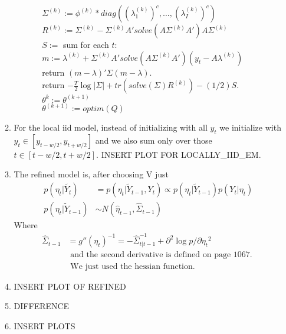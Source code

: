 \documentclass[paper=a4, fontsize=11pt]{scrartcl}
\begin{document}
\begin{enumerate}
\begin{enumerate}[1]
\begin{enumerate}[a.]
\begin{enumerate}[I.]
\begin{tabbing}
                  \hspace{2cm} $\Sigma^{(k)} := \phi^{(k)}*diag((\lambda_1^{(k)})^c, \ldots, (\lambda_I^{(k)})^c)$ \\
                  \hspace{2cm} $R^{(k)} := \Sigma^{(k)} - \Sigma^{(k)}A'solve(A\Sigma^{(k)}A')A\Sigma^{(k)}$ \\
                  \hspace{2cm} $S := $ sum for each $t$: \\
                  \hspace{3cm} $m := \lambda^{(k)} + \Sigma^{(k)}A'solve(A\Sigma^{(k)}A')(y_t - A\lambda^{(k)})$ \\
                  \hspace{3cm} return $(m - \lambda)'\Sigma(m - \lambda)$. \\
                  \hspace{2cm} return $-\frac{T}{2}\log{|\Sigma|} + tr(solve(\Sigma)R^{(k)}) - (1/2)S$. \\
                  \hspace{1cm} $\theta^{k} := \theta^{(k+1)}$ \\
                  \hspace{1cm} $\theta^{(k+1)} := optim(Q)$
                \end{tabbing}
            \end{enumerate}
        \end{enumerate}
      \item For the local iid model, instead of initializing with all $y_t$ we initialize with $y_t \in [y_{t - w/2}, y_{t+w/2}]$ and we also sum only over those $t \in [t - w/2, t + w/2]$. INSERT PLOT FOR LOCALLY\_IID\_EM.
      \item The refined model is, after choosing V just \\
      \begin{align*}
        p(\eta_t|\widetilde{Y_t}) &= p(\eta_t|\widetilde{Y}_{t-1}, Y_t) \propto p(\eta_t|\widetilde{Y}_{t-1})p(Y_t|\eta_t) \\
        p(\eta_t|\widetilde{Y}_{t-1}) &\sim N(\hat{\eta}_{t-1}, \hat{\Sigma}_{t-1})
      \end{align*}
      Where
      \begin{align*}
        \hat{\Sigma}_{t-1} &= g''(\eta_t)^{-1} = -\hat{\Sigma}^{-1}_{t|t-1} + \partial^2{\log{p}}/\partial{\eta_t}^2 \\
        & \text{ and the second derivative is defined on page 1067. } \\
        & \text { We just used the hessian function. }
      \end{align*}
      \item INSERT PLOT OF REFINED
      \item DIFFERENCE
      \item INSERT PLOTS
    \end{enumerate}
\end{enumerate}
\end{document}
